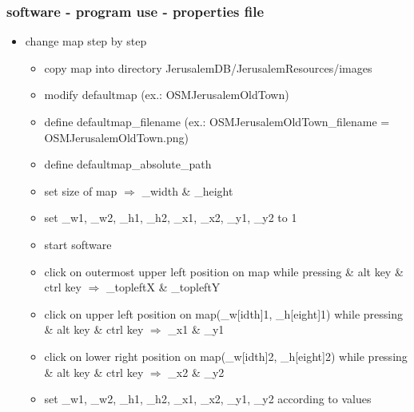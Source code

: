 \documentclass{beamer}
\begin{document}
	\begin{frame}
			\frametitle{software - program use - properties file} 
				\begin{itemize}	
					\item change map step by step
					\begin{itemize}
						\item copy map into directory JerusalemDB/JerusalemResources/images 
						\item modify defaultmap (ex.: OSMJerusalemOldTown)
						\item define defaultmap\_filename (ex.: OSMJerusalemOldTown\_filename = OSMJerusalemOldTown.png) 
						\item define defaultmap\_absolute\_path 
						\item set size of map $\Rightarrow$ \_width \& \_height
						\item set \_w1, \_w2, \_h1, \_h2, \_x1, \_x2, \_y1, \_y2 to 1
						\item start software
						\item click on outermost upper left position on map while pressing \& alt key \& ctrl key $\Rightarrow$ \_topleftX \& \_topleftY
						\item click on upper left position on map(\_w[idth]1, \_h[eight]1) while pressing \& alt key \& ctrl key $\Rightarrow$ \_x1 \& \_y1
								\item click on lower right position on map(\_w[idth]2, \_h[eight]2) while pressing \& alt key \& ctrl key $\Rightarrow$ \_x2 \& \_y2
						\item set \_w1, \_w2, \_h1, \_h2, \_x1, \_x2, \_y1, \_y2 according to values
					\end{itemize}
				\end{itemize}
	\end{frame}		
\end{document}
